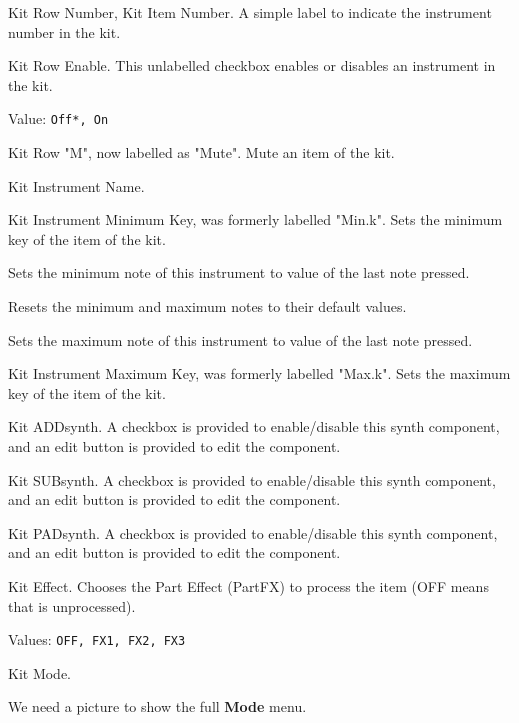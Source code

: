    \setcounter{ItemCounter}{0}      %

   Kit Row Number, Kit Item Number.
   A simple label to indicate the instrument number in the kit.

   Kit Row Enable.  This unlabelled checkbox enables or disables an instrument
   in the kit.

   Value: \texttt{Off*, On}

   Kit Row "M", now labelled as "Mute".
   Mute an item of the kit.

   Kit Instrument Name.

   Kit Instrument Minimum Key, was formerly labelled "Min.k".
   Sets the minimum key of the item of the kit.

   Sets the minimum note of this instrument to value of the last note
   pressed.

   Resets the minimum and maximum notes to their default values.

   Sets the maximum note of this instrument to value of the last note
   pressed.

   Kit Instrument Maximum Key, was formerly labelled "Max.k".
   Sets the maximum key of the item of the kit.

   Kit ADDsynth.
   A checkbox is provided to enable/disable this synth component, and
   an edit button is provided to edit the component.

   Kit SUBsynth.
   A checkbox is provided to enable/disable this synth component, and
   an edit button is provided to edit the component.

   Kit PADsynth.
   A checkbox is provided to enable/disable this synth component, and
   an edit button is provided to edit the component.

   Kit Effect.
   Chooses the Part Effect (PartFX) to process the item (OFF means that is
   unprocessed). 

   Values: \texttt{OFF, FX1, FX2, FX3}

   Kit Mode.

   We need a picture to show the full \textbf{Mode} menu.

